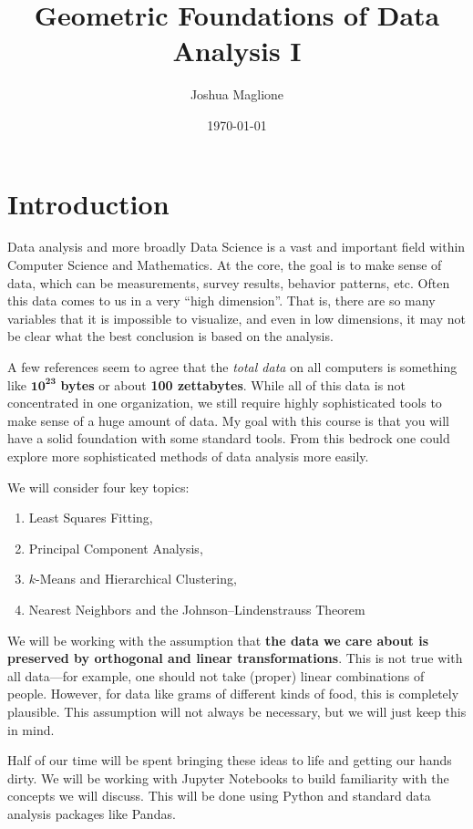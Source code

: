 \documentclass[a4paper, 12pt]{article}
\title{Geometric Foundations of Data Analysis I}
\author{Joshua Maglione}
\date{\today}
\numberwithin{equation}{section}
\numberwithin{figure}{section}
\theoremstyle{definition}
\begin{document}
\maketitle
\tableofcontents

\section{Introduction}

Data analysis and more broadly Data Science is a vast and important field within
Computer Science and Mathematics. At the core, the goal is to make sense of
data, which can be measurements, survey results, behavior patterns, etc. Often
this data comes to us in a very ``high dimension''. That is, there are so many
variables that it is impossible to visualize, and even in low
dimensions, it may not be clear what the best conclusion is based on the
analysis. 

A few references seem to agree that the \textit{total data} on all computers is
something like $\mathbf{10^{23}}$ \textbf{bytes} or about \textbf{100
zettabytes}. While all of this data is not concentrated in one organization, we
still require highly sophisticated tools to make sense of a huge amount of data.
My goal with this course is that you will have a solid foundation with some
standard tools. From this bedrock one could explore more sophisticated methods
of data analysis more easily. 

\bigskip

\noindent We will consider four key topics:
\begin{enumerate} 
	\item Least Squares Fitting,
	\item Principal Component Analysis,
	\item $k$-Means and Hierarchical Clustering,
	\item Nearest Neighbors and the Johnson--Lindenstrauss Theorem
\end{enumerate}

We will be working with the assumption that \textbf{the data we care about is
preserved by orthogonal and linear transformations}. This is not true with all
data---for example, one should not take (proper) linear combinations of people.
However, for data like grams of different kinds of food, this is completely
plausible. This assumption will not always be necessary, but we will just keep
this in mind. 

Half of our time will be spent bringing these ideas to life and getting our
hands dirty. We will be working with Jupyter Notebooks to build familiarity with
the concepts we will discuss. This will be done using Python and standard data
analysis packages like Pandas. 
\end{document}
